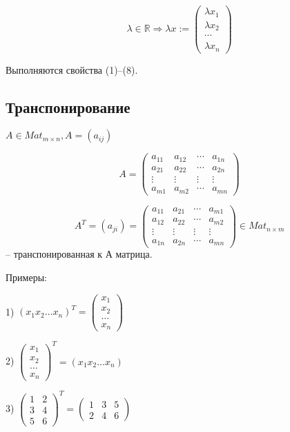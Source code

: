 \[\lambda \in \mathbb{R} \Rightarrow \lambda x := \begin{pmatrix}
\lambda x_1 \\
\lambda x_2 \\
\cdots \\
\lambda x_n 
\end{pmatrix}
\]

Выполняются свойства (1)--(8).

\vspace{\baselineskip}
\subsection{Транспонирование}

$A \in Mat_{m \times n}, A = (a_{ij})$

\[A = 
	\begin{pmatrix}
		a_{11} & a_{12} & \cdots & a_{1n} \\
		a_{21} & a_{22} & \cdots & a_{2n} \\
       \vdots & \vdots & \vdots& \vdots \\ 
       a_{m1} & a_{m2} & \cdots & a_{mn}
	\end{pmatrix}
\]

\[ A^T = (a_{ji}) = 
	\begin{pmatrix}
		a_{11} & a_{21} & \cdots & a_{m1} \\
		a_{12} & a_{22} & \cdots & a_{m2} \\
       \vdots & \vdots & \vdots& \vdots \\ 
       a_{1n} & a_{2n} & \cdots & a_{mn}
	\end{pmatrix} \in Mat_{n \times m}
\] 
-- транспонированная к А матрица.

\vspace{\baselineskip}
Примеры:

1) $(x_1 x_2 \dots x_n)^T = \begin{pmatrix} x_1 \\ x_2 \\ \dots \\ x_n \end{pmatrix}$

2) $\begin{pmatrix} x_1 \\ x_2 \\ \dots \\ x_n \end{pmatrix}^T = (x_1 x_2 \dots x_n)$

3) $\begin{pmatrix} 1 & 2 \\ 3 & 4 \\ 5 & 6 \end{pmatrix}^T = \begin{pmatrix} 1 & 3 & 5 \\ 2 & 4 & 6 \end{pmatrix}$

